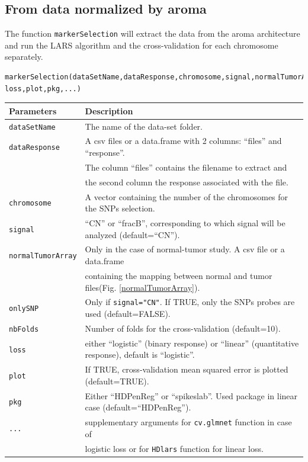 \documentclass[a4paper,10pt]{article}
\begin{document}
	\subsection{From data normalized by aroma}	

		The function \texttt{markerSelection} will extract the data from the aroma architecture and run the LARS algorithm and the cross-validation for each chromosome separately.
	
		\begin{verbatim}
markerSelection(dataSetName,dataResponse,chromosome,signal,normalTumorArray,onlySNP,nbFolds,
loss,plot,pkg,...)
		\end{verbatim}
	
	
		\begin{center}
			\begin{tabular}{|l|l|}
				\hline
				Parameters & Description\\
				\hline
				\texttt{dataSetName} & The name of the data-set folder.\\
				\texttt{dataResponse} & A csv files or a data.frame with 2 columns: ``files'' and ``response''.\\
				~ & The column ``files'' contains the filename to extract and\\
				~ &   the second column the response associated with the file.\\
				\texttt{chromosome} & A vector containing the number of the chromosomes for the SNPs selection.\\
				\texttt{signal} & ``CN'' or ``fracB'', corresponding to which signal will be analyzed (default=``CN'').\\
				\texttt{normalTumorArray} & Only in the case of normal-tumor study. A csv file or a data.frame\\
			~~ & containing the mapping between normal and tumor files(Fig. \ref{normalTumorArray}).\\
				\texttt{onlySNP} & Only if \texttt{signal="CN"}. If TRUE, only the SNPs probes are used (default=FALSE).\\
				\texttt{nbFolds} & Number of folds for the cross-validation (default=10).\\
				\texttt{loss}  & either ``logistic'' (binary response) or ``linear'' (quantitative response), default is ``logistic''.\\
				\texttt{plot} & If TRUE, cross-validation mean squared error is plotted (default=TRUE).\\
        \texttt{pkg} & Either ``HDPenReg'' or ``spikeslab''. Used package in linear case (default=``HDPenReg'').\\
				\texttt{...} & supplementary arguments for \texttt{cv.glmnet} function \cite{glmnet} in case of \\
				~ & logistic loss or for \texttt{HDlars} function for linear loss.\\
				\hline	
			\end{tabular}		
		\end{center}
	
\end{document}
